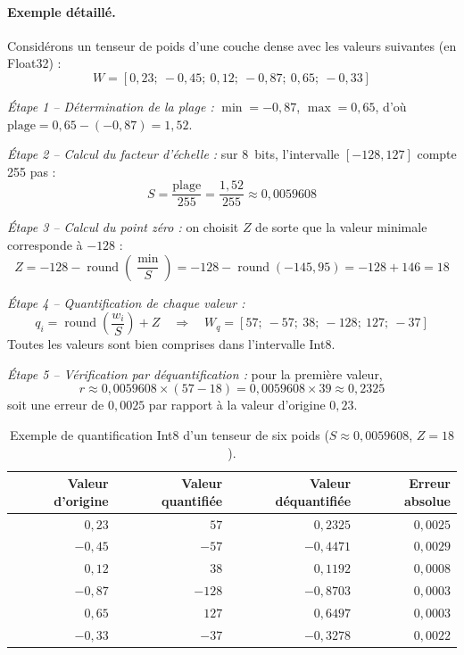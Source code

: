 \paragraph{Exemple détaillé.} Considérons un tenseur de poids d'une couche
dense avec les valeurs suivantes (en Float32) :
\[
  W = [0{,}23;\ -0{,}45;\ 0{,}12;\ -0{,}87;\ 0{,}65;\ -0{,}33]
\]

\textit{Étape 1 -- Détermination de la plage :} $\min = -0{,}87$,
$\max = 0{,}65$, d'où $\text{plage} = 0{,}65 - (-0{,}87) = 1{,}52$.

\textit{Étape 2 -- Calcul du facteur d'échelle :} sur 8~bits, l'intervalle
$[-128, 127]$ compte 255 pas :
\[
  S = \frac{\text{plage}}{255} = \frac{1{,}52}{255} \approx 0{,}0059608
\]

\textit{Étape 3 -- Calcul du point zéro :} on choisit $Z$ de sorte que la
valeur minimale corresponde à $-128$ :
\[
  Z = -128 - \operatorname{round}\!\left(\frac{\min}{S}\right)
    = -128 - \operatorname{round}(-145{,}95) = -128 + 146 = 18
\]

\textit{Étape 4 -- Quantification de chaque valeur :}
\[
  q_i = \operatorname{round}\!\left(\frac{w_i}{S}\right) + Z
  \quad\Rightarrow\quad
  W_q = [57;\ -57;\ 38;\ -128;\ 127;\ -37]
\]
Toutes les valeurs sont bien comprises dans l'intervalle Int8.

\textit{Étape 5 -- Vérification par déquantification :} pour la première valeur,
\[
  r \approx 0{,}0059608 \times (57 - 18) = 0{,}0059608 \times 39 \approx 0{,}2325
\]
soit une erreur de $0{,}0025$ par rapport à la valeur d'origine $0{,}23$.

\begin{table}[H]
\centering
\small
\begin{tabular}{rrrr}
\toprule
Valeur d'origine & Valeur quantifiée & Valeur déquantifiée & Erreur absolue \\
\midrule
$0{,}23$  & $57$   & $0{,}2325$  & $0{,}0025$ \\
$-0{,}45$ & $-57$  & $-0{,}4471$ & $0{,}0029$ \\
$0{,}12$  & $38$   & $0{,}1192$  & $0{,}0008$ \\
$-0{,}87$ & $-128$ & $-0{,}8703$ & $0{,}0003$ \\
$0{,}65$  & $127$  & $0{,}6497$  & $0{,}0003$ \\
$-0{,}33$ & $-37$  & $-0{,}3278$ & $0{,}0022$ \\
\bottomrule
\end{tabular}
\caption{Exemple de quantification Int8 d'un tenseur de six poids ($S \approx 0{,}0059608$, $Z = 18$).}
\label{tab:quant-exemple}
\end{table}

